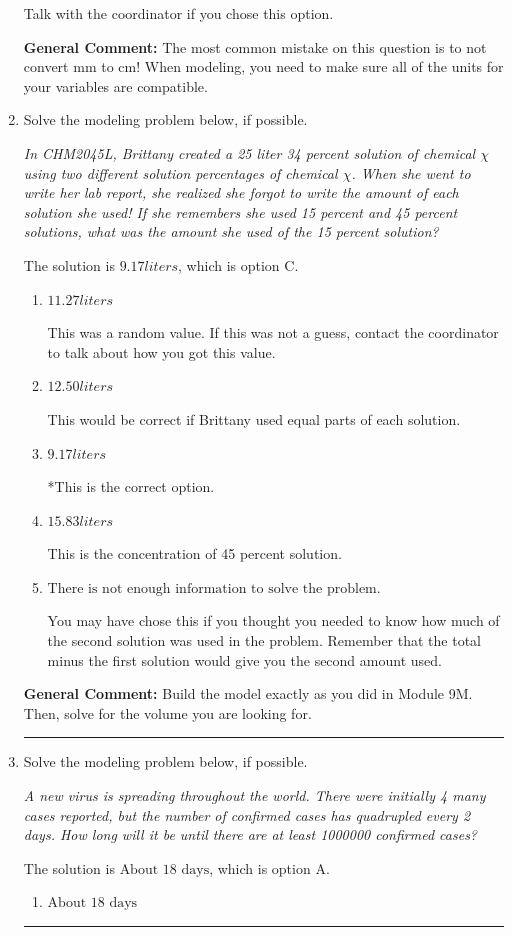 \documentclass{extbook}[14pt]
\newcommand{\litem}[1]{\item #1

\rule{\textwidth}{0.4pt}}
\begin{document}
\begin{enumerate}
{\begin{enumerate}[label=\Alph*.]
Talk with the coordinator if you chose this option.
\end{enumerate}

\textbf{General Comment:} The most common mistake on this question is to not convert mm to cm! When modeling, you need to make sure all of the units for your variables are compatible.
}
\litem{
Solve the modeling problem below, if possible.

\begin{center}
    \textit{ In CHM2045L, Brittany created a 25 liter 34 percent solution of chemical $\chi$ using two different solution percentages of chemical $\chi$. When she went to write her lab report, she realized she forgot to write the amount of each solution she used! If she remembers she used 15 percent and 45 percent solutions, what was the amount she used of the 15 percent solution? }
\end{center}
The solution is \( 9.17 liters \), which is option C.\begin{enumerate}[label=\Alph*.]
\item \( 11.27 liters \)

This was a random value. If this was not a guess, contact the coordinator to talk about how you got this value.
\item \( 12.50 liters \)

This would be correct if Brittany used equal parts of each solution.
\item \( 9.17 liters \)

*This is the correct option.
\item \( 15.83 liters \)

This is the concentration of 45 percent solution.
\item \( \text{There is not enough information to solve the problem.} \)

You may have chose this if you thought you needed to know how much of the second solution was used in the problem. Remember that the total minus the first solution would give you the second amount used.
\end{enumerate}

\textbf{General Comment:} Build the model exactly as you did in Module 9M. Then, solve for the volume you are looking for.
}
\litem{
Solve the modeling problem below, if possible.

\begin{center}
    \textit{ A new virus is spreading throughout the world. There were initially 4 many cases reported, but the number of confirmed cases has quadrupled every 2 days. How long will it be until there are at least 1000000 confirmed cases? }
\end{center}
The solution is \( \text{About } 18 \text{ days} \), which is option A.\begin{enumerate}[label=\Alph*.]
\item \( \text{About } 18 \text{ days} \)


\end{enumerate}}
\end{enumerate}
\end{document}
